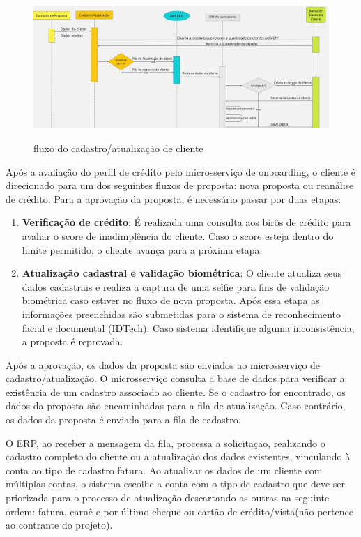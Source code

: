 \begin{figure} [!h]
    \centering
    \caption{fluxo do cadastro/atualização de cliente}
    \includegraphics[width=1\textwidth]{arquivos/imagens/Cadastro-Atualizacao-fluxo.jpg}
    \label{fluxo-Cadastro-Atualizacao}
\end{figure}

Após a avaliação do perfil de crédito pelo microsserviço de onboarding, 
o cliente é direcionado para um dos seguintes fluxos de proposta: 
nova proposta ou reanálise de crédito. 
Para a aprovação da proposta, é necessário passar por duas etapas:
\begin{enumerate}
    \item \textbf{Verificação de crédito}: É realizada uma consulta aos birôs de 
    crédito para avaliar o score de inadimplência do cliente. 
    Caso o score esteja dentro do limite permitido, o cliente avança 
    para a próxima etapa.
    \item \textbf{Atualização cadastral e validação biométrica}: O cliente 
    atualiza seus dados cadastrais e realiza a captura de uma selfie para fins 
    de validação biométrica caso estiver no fluxo de nova proposta.
    Após essa etapa as informações preenchidas são 
    submetidas para o sistema de reconhecimento facial e documental (IDTech). 
    Caso sistema identifique alguma inconsistência, a proposta é reprovada.
\end{enumerate}

Após a aprovação, os dados da proposta são enviados ao microsserviço de 
cadastro/atualização. O microsserviço consulta a base de dados para verificar a 
existência de um cadastro associado ao cliente. Se o cadastro for encontrado, 
os dados da proposta são encaminhadas para a fila de atualização. 
Caso contrário, os dados da proposta é enviada para a fila de cadastro.

O ERP, ao receber a mensagem da fila, 
processa a solicitação, realizando o cadastro completo do
cliente ou a atualização dos dados existentes, vinculando à conta ao tipo de 
cadastro fatura. Ao atualizar os dados de um cliente com múltiplas contas, 
o sistema escolhe a conta com o tipo de cadastro que deve ser priorizada para 
o processo de atualização descartando as outras na seguinte ordem: 
fatura, carnê e por último cheque ou cartão de crédito/vista(não pertence ao contrante do projeto).

